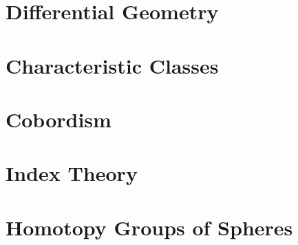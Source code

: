 \documentclass{lkx_thesis}
\begin{document}
\begin{appendices}
\chapter{Differential Geometry}\label{chap:differential_geometry}


\chapter{Characteristic Classes}\label{chap:characteristic_classes}


\chapter{Cobordism}\label{chap:cobordism}


\chapter{Index Theory}\label{chap:index_theory}


\chapter{Homotopy Groups of Spheres}\label{chap:homotopy_groups_of_spheres}

\end{appendices}

\lkxrefs
\lkxindex
\end{document}
